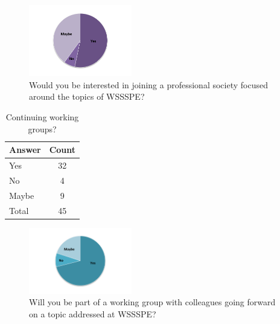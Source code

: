 \begin{figure}[h]
\includegraphics[width=0.4\textwidth]{figures/SurveyFig5rev}
\caption{Would you be interested in joining a professional society focused around the topics of WSSSPE?
\label{fig:SFig5}}
\end{figure}




\begin{table}[h!]
\centering
\caption{Continuing working groups?}
\label{tab:survey_continuing_wgs}
\begin{tabular}{|l|c|}
\hline
{\bf Answer} &
{\bf Count} \\ \hline
Yes &
32 \\
No &
4 \\
Maybe &
9 \\
Total &
45 \\
\hline
\end{tabular}
\end{table}

\begin{figure}[h]
\includegraphics[width=0.4\textwidth]{figures/SurveyFig6rev}
\caption{Will you be part of a working group  with colleagues going forward  on a topic addressed at WSSSPE?
\label{fig:SFig6}}
\end{figure}




